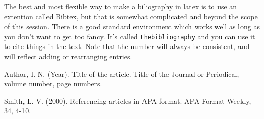 \documentclass[twocolumn,10 pt,showpacs,preprintnumbers,amsmath,amssymb]{revtex4-1}%
\begin{document}
The best and most flexible way to make a biliography in latex is to use an extention
called Bibtex, but that is somewhat complicated and beyond the scope of this session.
There is a good standard environment which works well as long as you don't want to
get too fancy.  It's called \verb_thebibliography_\cite{author} and you can use it to 
cite things in the text\cite{smith}.  Note that the number will always
be consistent, and will reflect adding or rearranging entries\cite{author}.

\begin{thebibliography}{99}

 Author, I. N. (Year). Title of the article. Title of the Journal or Periodical, volume number, page numbers.

 Smith, L. V. (2000). Referencing articles in APA format. APA Format Weekly, 34, 4-10.

\end{thebibliography}
\end{document}
